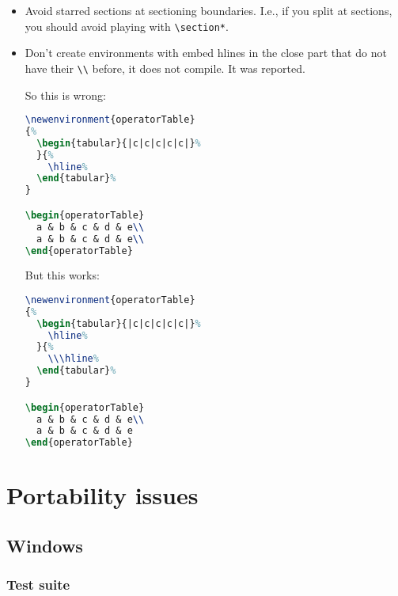 \documentclass[openright,twoside,11pt]{book}
\begin{document}
\begin{itemize}
\item Avoid starred sections at sectioning boundaries.  I.e., if you
  split at sections, you should avoid playing with
  \lstinline|\section*|.

\item Don't create environments with embed hlines in the close part
  that do not have their \lstinline|\\| before, it does not compile.
  It was reported.

  So this is wrong:
\begin{lstlisting}[language=LaTeX]
\newenvironment{operatorTable}
{%
  \begin{tabular}{|c|c|c|c|c|}%
  }{%
    \hline%
  \end{tabular}%
}

\begin{operatorTable}
  a & b & c & d & e\\
  a & b & c & d & e\\
\end{operatorTable}
\end{lstlisting}

  But this works:
\begin{lstlisting}[language=LaTeX]
\newenvironment{operatorTable}
{%
  \begin{tabular}{|c|c|c|c|c|}%
    \hline%
  }{%
    \\\hline%
  \end{tabular}%
}

\begin{operatorTable}
  a & b & c & d & e\\
  a & b & c & d & e
\end{operatorTable}
\end{lstlisting}
\end{itemize}

\chapter{Portability issues}

\section{Windows}

\subsection{Test suite}
\end{document}
